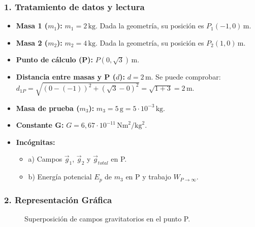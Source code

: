 \subsubsection*{1. Tratamiento de datos y lectura}
\begin{itemize}
    \item \textbf{Masa 1 ($m_1$):} $m_1 = 2\,\text{kg}$. Dada la geometría, su posición es $P_1(-1, 0)\,\text{m}$.
    \item \textbf{Masa 2 ($m_2$):} $m_2 = 4\,\text{kg}$. Dada la geometría, su posición es $P_2(1, 0)\,\text{m}$.
    \item \textbf{Punto de cálculo (P):} $P(0, \sqrt{3})\,\text{m}$.
    \item \textbf{Distancia entre masas y P ($d$):} $d=2\,\text{m}$. Se puede comprobar: $d_{1P} = \sqrt{(0-(-1))^2 + (\sqrt{3}-0)^2} = \sqrt{1+3} = 2\,\text{m}$.
    \item \textbf{Masa de prueba ($m_3$):} $m_3 = 5\,\text{g} = 5\cdot10^{-3}\,\text{kg}$.
    \item \textbf{Constante G:} $G=6,67\cdot10^{-11}\,\text{Nm}^2/\text{kg}^2$.
    \item \textbf{Incógnitas:}
    \begin{itemize}
        \item a) Campos $\vec{g}_1$, $\vec{g}_2$ y $\vec{g}_{total}$ en P.
        \item b) Energía potencial $E_p$ de $m_3$ en P y trabajo $W_{P \to \infty}$.
    \end{itemize}
\end{itemize}

\subsubsection*{2. Representación Gráfica}
\begin{figure}[H]
    \centering
    \caption{Superposición de campos gravitatorios en el punto P.}
\end{figure}

